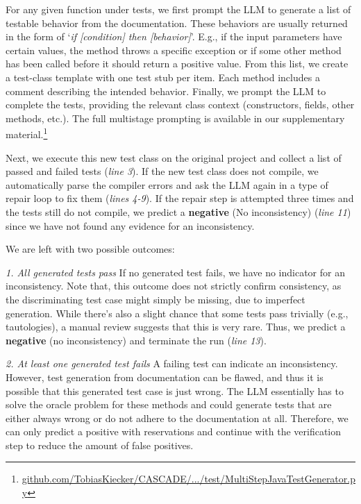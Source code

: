\documentclass[acmsmall, screen]{acmart}
\begin{document}
For any given function under tests, we first prompt the LLM to generate a list of testable behavior from the documentation. These behaviors are usually returned in the form of `\textit{if [condition] then [behavior]}'. E.g., if the input parameters have certain values, the method throws a specific exception or if some other method has been called before it should return a positive value. 
From this list, we create a test-class template with one test stub per item. Each method includes a comment describing the intended behavior.
Finally, we prompt the LLM to complete the tests, providing the relevant class context (constructors, fields, other methods, etc.). The full multistage prompting is available in our supplementary material.\footnote{\href{https://github.com/TobiasKiecker/CASCADE/blob/FSE2026-v1.0.0/src/cascade/generation/test/MultiStepJavaTestGenerator.py}{github.com/TobiasKiecker/CASCADE/.../test/MultiStepJavaTestGenerator.py}}

Next, we execute this new test class on the original project and collect a list of passed and failed tests (\textit{line 3}).
If the new test class does not compile, we automatically parse the compiler errors and ask the LLM again in a type of repair loop to fix them (\textit{lines 4-9}). If the repair step is attempted three times and the tests still do not compile, we predict a \textbf{negative} (No inconsistency) (\textit{line 11}) since we have not found any evidence for an inconsistency. 


We are left with two possible outcomes: 

\emph{1. All generated tests pass} 
If no generated test fails, we have no indicator for an inconsistency. Note that, this outcome does not strictly confirm consistency, as the discriminating test case might simply be missing, due to imperfect generation. While there's also a slight chance that some tests pass trivially (e.g., tautologies), a manual review suggests that this is very rare. Thus, we predict a \textbf{negative} (no inconsistency) and terminate the run (\textit{line 13}).

\emph{2. At least one generated test fails} 
A failing test can indicate an inconsistency. However, test generation from documentation can be flawed, and thus it is possible that this generated test case is just wrong. The LLM essentially has to solve the oracle problem for these methods and could generate tests that are either always wrong or do not adhere to the documentation at all. 
Therefore, we can only predict a positive with reservations and continue with the verification step to reduce the amount of false positives.
\end{document}

